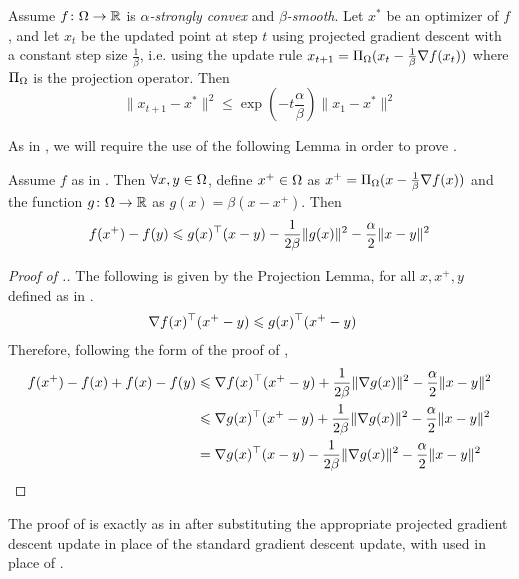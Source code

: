 \begin{theorem} Assume $f\colon\Omega\to\mathbb{R}$ is \emph{$\alpha$-strongly convex} and \emph{$\beta$-smooth}. Let $x^{*}$ be an optimizer of $f$, and let $x_{t}$ be the updated point at step $t$ using projected gradient descent with a constant step size $\frac{1}{\beta}$, i.e. using the update rule $x_{t+1} = \Pi_{\Omega}(x_{t} - \frac{1}{\beta}\nabla f(x_{t}))$ where $\Pi_{\Omega}$ is the projection operator. Then
\[
\|x_{t+1} - x^*\|^2 \leq \exp{(-t \frac{\alpha}{\beta})}\|x_1 - x^*\|^2
\]
\end{theorem}
As in , we will require the use of the following Lemma in order to prove . 

\begin{lemma}
    Assume $f$ as in . Then $\forall x,y \in \Omega$, define $x^+\in\Omega$ as $x^+ = \Pi_{\Omega}(x - \frac{1}{\beta}\nabla f(x))$ and the function $g\colon\Omega\to\mathbb{R}$ as $g(x) = \beta(x-x^+)$. Then
    \[
        f(x^+) - f(y) \leqslant g(x)^\top (x-y) - \frac{1}{2\beta}\|g(x)\|^2 - \frac{\alpha}{2}\|x-y\|^2
    \]
\end{lemma}

\begin{proof}[Proof of .]
    The following is given by the Projection Lemma, for all $x,x^+,y$ defined as in .
    \begin{align*}
        \nabla f(x)^\top (x^+ - y) &\leqslant g(x)^\top(x^+ - y)
    \end{align*}
    Therefore, following the form of the proof of ,
    \begin{align*}
        f(x^+) - f(x) + f(x) - f(y) &\leqslant \nabla f(x)^\top(x^+-y) + \frac{1}{2\beta}\|\nabla g(x)\|^2 - \frac{\alpha}{2}\|x-y\|^2\\
        &\leqslant \nabla g(x)^\top(x^+-y) + \frac{1}{2\beta}\|\nabla g(x)\|^2 - \frac{\alpha}{2}\|x-y\|^2\\
        &= \nabla g(x)^\top(x-y) - \frac{1}{2\beta}\|\nabla g(x)\|^2 - \frac{\alpha}{2}\|x-y\|^2\\
    \end{align*}
\end{proof}
The proof of  is exactly as in  after substituting the appropriate projected gradient descent update in place of the standard gradient descent update, with  used in place of . 
